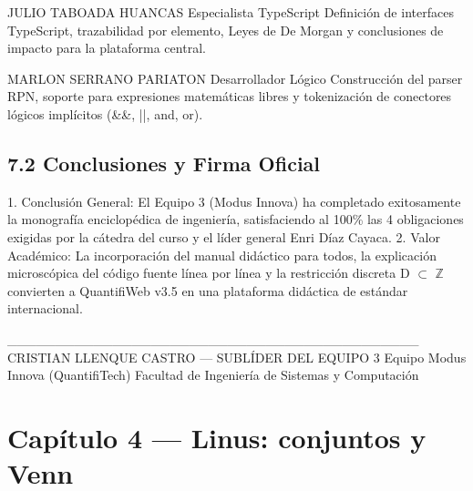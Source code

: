 \documentclass[11pt,a4paper]{article}
\begin{document}
JULIO TABOADA HUANCAS   Especialista TypeScript Definición de
interfaces TypeScript,
trazabilidad por
elemento, Leyes de De
Morgan y conclusiones
de impacto para la
plataforma central.

MARLON SERRANO PARIATON Desarrollador Lógico    Construcción del parser
RPN, soporte para
expresiones matemáticas
libres y tokenización
de conectores lógicos
implícitos (\&\&, ||,
and, or).
\medskip\hrulefill\medskip

\subsection{7.2 Conclusiones y Firma Oficial}

1. Conclusión General: El Equipo 3 (Modus Innova) ha completado
exitosamente la monografía enciclopédica de ingeniería, satisfaciendo al
100\% las 4 obligaciones exigidas por la cátedra del curso y el líder
general Enri Díaz Cayaca.
2. Valor Académico: La incorporación del manual didáctico para todos, la
explicación microscópica del código fuente línea por línea y la
restricción discreta D $ \subset $ $\mathbb{Z}$ convierten a QuantifiWeb v3.5 en una
plataforma didáctica de estándar internacional.

\_\_\_\_\_\_\_\_\_\_\_\_\_\_\_\_\_\_\_\_\_\_\_\_\_\_\_\_\_\_\_\_\_\_\_\_\_\_\_\_\_\_\_
CRISTIAN LLENQUE CASTRO --- SUBLÍDER DEL EQUIPO 3
Equipo Modus Innova (QuantifiTech)
Facultad de Ingeniería de Sistemas y Computación

\section{Cap\'itulo 4 --- Linus: conjuntos y Venn}
\end{document}
